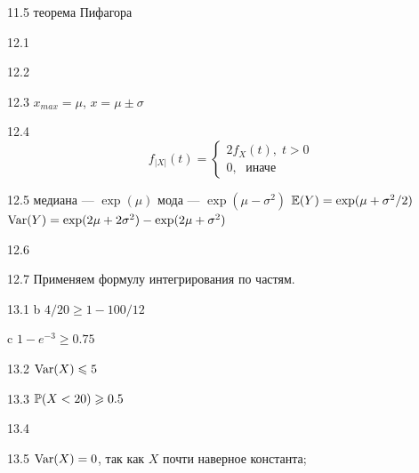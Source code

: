 \begin{solution}{{11.5}}
теорема Пифагора
\end{solution}
\protect \hypertarget {soln:12.1}{}
\begin{solution}{{12.1}}
\end{solution}
\protect \hypertarget {soln:12.2}{}
\begin{solution}{{12.2}}
\end{solution}
\protect \hypertarget {soln:12.3}{}
\begin{solution}{{12.3}}
$x_{max}=\mu$, $x=\mu \pm \sigma$
\end{solution}
\protect \hypertarget {soln:12.4}{}
\begin{solution}{{12.4}}
  \[
  f_{|X|}(t) =
  \begin{cases}
  2f_X(t), \; t>0 \\
  0, \; \text{ иначе }
  \end{cases}
  \]
\end{solution}
\protect \hypertarget {soln:12.5}{}
\begin{solution}{{12.5}}
  медиана — $\exp(\mu)$
  мода — $\exp(\mu - \sigma^2)$
  $\E(Y)=\exp(\mu+\sigma^2/2)$
  $\Var(Y)=\exp(2\mu + 2\sigma^2)-\exp(2\mu + \sigma^2)$

\end{solution}
\protect \hypertarget {soln:12.6}{}
\begin{solution}{{12.6}}
\end{solution}
\protect \hypertarget {soln:12.7}{}
\begin{solution}{{12.7}}
  Применяем формулу интегрирования по частям.
\end{solution}
\protect \hypertarget {soln:13.1}{}
\begin{solution}{{13.1}}
  b $4/20\geq 1-100/12$

  c $1-e^{-3}\geq 0.75$
\end{solution}
\protect \hypertarget {soln:13.2}{}
\begin{solution}{{13.2}}
  $\Var(X)\leq 5$
\end{solution}
\protect \hypertarget {soln:13.3}{}
\begin{solution}{{13.3}}
  $\P(X<20) \geq 0.5$
\end{solution}
\protect \hypertarget {soln:13.4}{}
\begin{solution}{{13.4}}
\end{solution}
\protect \hypertarget {soln:13.5}{}
\begin{solution}{{13.5}}
  $\Var(X)=0$, так как $X$ почти наверное константа;
\end{solution}
